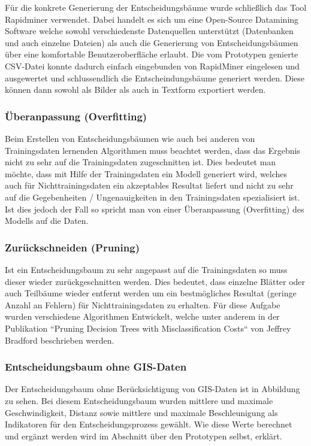 Für die konkrete Generierung der Entscheidungsbäume wurde schließlich das Tool Rapidminer verwendet. Dabei handelt es sich um eine Open-Source Datamining Software welche sowohl verschiedenste Datenquellen unterstützt (Datenbanken und auch einzelne Dateien) als auch die Generierung von Entscheidungsbäumen über eine komfortable Benutzeroberfläche erlaubt. Die vom Prototypen genierte CSV-Datei konnte dadurch einfach eingebunden von RapidMiner eingelesen und ausgewertet und schlussendlich die Entscheindungsbäume generiert werden. Diese können dann sowohl als Bilder als auch in Textform exportiert werden.

\subsubsection{Überanpassung (Overfitting)}
Beim Erstellen von Entscheidungsbäumen wie auch bei anderen von Trainingsdaten lernenden Algorithmen muss beachtet werden, dass das Ergebnis nicht zu sehr auf die Trainingsdaten zugeschnitten ist. Dies bedeutet man möchte, dass mit Hilfe der Trainingsdaten ein Modell generiert wird, welches auch für Nichttrainingsdaten ein akzeptables Resultat liefert und nicht zu sehr auf die Gegebenheiten / Ungenauigkeiten in den Trainingsdaten spezialisiert ist. Ist dies jedoch der Fall so spricht man von einer Überanpassung (Overfitting) des Modells auf die Daten.  \cite{tom_dietterich_overfitting_1995}

\subsubsection{Zurückschneiden (Pruning)}
Ist ein Entscheidungsbaum zu sehr angepasst auf die Trainingsdaten so muss dieser wieder zurückgeschnitten werden. Dies bedeutet, dass einzelne Blätter oder auch Teilbäume wieder entfernt werden um ein bestmögliches Resultat (geringe Anzahl an Fehlern) für Nichttrainingsdaten zu erhalten. Für diese Aufgabe wurden verschiedene Algorithmen Entwickelt, welche unter anderem in der Publikation ``Pruning Decision Trees with Misclassification Costs`` von Jeffrey Bradford beschrieben werden. \cite{jeffrey_p._bradford_pruning_1998}

\subsubsection{Entscheidungsbaum ohne GIS-Daten}
Der Entscheidungsbaum ohne Berücksichtigung von GIS-Daten ist in Abbildung  zu sehen. Bei diesem Entscheidungsbaum wurden mittlere und maximale Geschwindigkeit, Distanz sowie mittlere und maximale Beschleunigung als Indikatoren für den Entscheidungsprozess gewählt. Wie diese Werte berechnet und ergänzt werden wird im Abschnitt über den Prototypen selbst, erklärt. 

